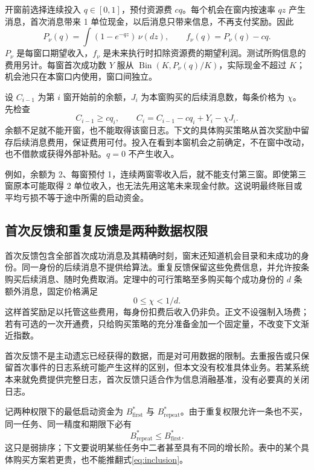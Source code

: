 开窗前选择连续投入 $q\in[0,1]$，预付资源费 $cq$。每个机会在窗内按速率 $qz$ 产生消息，首次消息带来 1 单位现金，以后消息只带来信息，不再支付奖励。因此
\begin{equation}\label{eq:income}
 P_\nu(q)=\int(1-e^{-qz})\,\nu(dz),\qquad
 f_\nu(q)=P_\nu(q)-cq.
\end{equation}
$P_\nu$ 是每窗口期望收入，$f_\nu$ 是未来执行时扣除资源费的期望利润。测试所购信息的费用另计。每窗首次成功数 $Y$ 服从 $\operatorname{Bin}(K,P_\nu(q)/K)$，实际现金不超过 $K$；机会池只在本窗口内使用，窗口间独立。

设 $C_{i-1}$ 为第 $i$ 窗开始前的余额，$J_i$ 为本窗购买的后续消息数，每条价格为 $\chi$。先检查
\begin{equation}\label{eq:cash}
 C_{i-1}\geq cq_i,
 \qquad C_i=C_{i-1}-cq_i+Y_i-\chi J_i.
\end{equation}
余额不足就不能开窗，也不能取得该窗日志。下文的具体购买策略从首次奖励中留存后续消息费用，保证费用可付。投入在看到本窗机会之前确定，不在窗中改动，也不借款或获得外部补贴。$q=0$ 不产生收入。

例如，余额为 2、每窗预付 1，连续两窗零收入后，就不能支付第三窗。即使第三窗原本可能取得 2 单位收入，也无法先用这笔未来现金付款。这说明最终账目或平均亏损不等于途中所需的启动资金。

\subsection{首次反馈和重复反馈是两种数据权限}
首次反馈包含全部首次成功消息及其精确时刻，窗末还知道机会目录和未成功的身份。同一身份的后续消息不提供给算法。重复反馈保留这些免费信息，并允许按条购买后续消息、随时免费取消。定理中的可行策略至多购买每个成功身份的 $d$ 条额外消息，固定价格满足
\[
 0\leq\chi<1/d.
\]
这样首奖励足以托管这些费用，每身份扣费后收入仍非负。正文不设强制入场费；若有可选的一次开通费，只给购买策略的充分准备金加一个固定量，不改变下文渐近指数。

首次反馈不是主动遗忘已经获得的数据，而是对可用数据的限制。去重报告或只保留首次事件的日志系统可能产生这样的区别，但本文没有校准具体业务。若某系统本来就免费提供完整日志，首次反馈只适合作为信息消融基准，没有必要真的关闭日志。

记两种权限下的最低启动资金为 $B^*_{\mathrm{first}}$ 与 $B^*_{\mathrm{repeat}}$。由于重复权限允许一条也不买，同一任务、同一精度和期限下必有
\begin{equation}\label{eq:inclusion}
 B^*_{\mathrm{repeat}}\leq B^*_{\mathrm{first}}.
\end{equation}
这只是弱排序；下文要说明某些任务中二者甚至具有不同的增长阶。表中的某个具体购买方案若更贵，也不能推翻式\eqref{eq:inclusion}。

